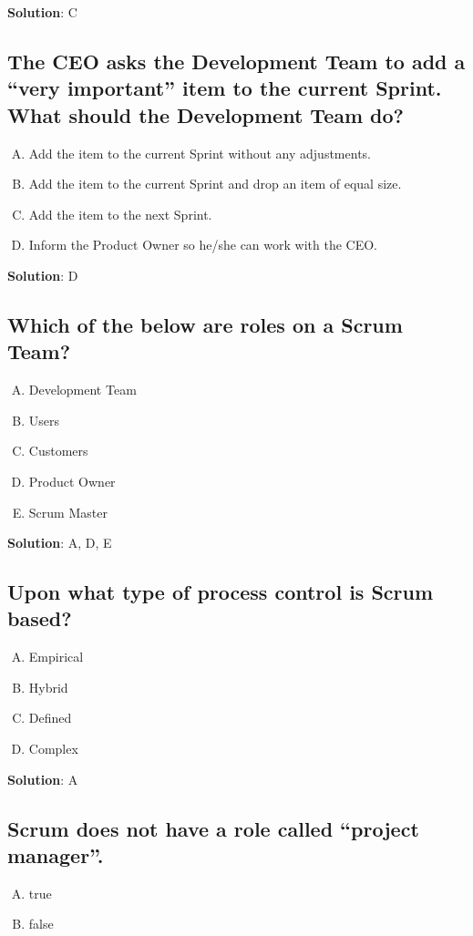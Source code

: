 \textbf{Solution}: C


\subsection{The CEO asks the Development Team to add a \enquote{very important} item to the current Sprint. What should the Development Team do?}
\begin{enumerate}[A)]
  \item Add the item to the current Sprint without any adjustments.
  \item Add the item to the current Sprint and drop an item of equal size.
  \item Add the item to the next Sprint.
  \item Inform the Product Owner so he/she can work with the CEO.
\end{enumerate}


\textbf{Solution}: D


\subsection{Which of the below are roles on a Scrum Team?}
\begin{enumerate}[A)]
  \item Development Team
  \item Users
  \item Customers
  \item Product Owner
  \item Scrum Master
\end{enumerate}


\textbf{Solution}: A, D, E


\subsection{Upon what type of process control is Scrum based?}
\begin{enumerate}[A)]
  \item Empirical
  \item Hybrid
  \item Defined
  \item Complex
\end{enumerate}


\textbf{Solution}: A


\subsection{Scrum does not have a role called \enquote{project manager}.}
\begin{enumerate}[A)]
  \item true
  \item false
\end{enumerate}


